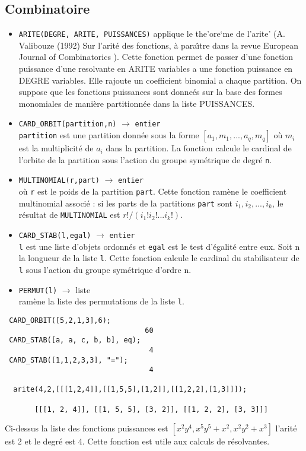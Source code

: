 \subsection{Combinatoire}
  \begin{itemize}
    \item {\tt ARITE(DEGRE, ARITE, PUISSANCES)}
applique le the'ore`me de l'arite'
(A. Valibouze (1992) Sur l'arit\'e des fonctions, \`a para{\^ \i}tre dans 
la revue European Journal of Combinatorics ). Cette fonction permet de
passer d'une fonction puissance d'une  resolvante en ARITE variables 
a une fonction puissance en DEGRE variables. Elle rajoute un
coefficient binomial a chaque partition. On suppose que les fonctions
puissances sont donne\'es sur la base des formes monomiales de mani\`ere
partitionn\'ee dans la liste PUISSANCES.

    \item {\tt CARD\_ORBIT(partition,n)}
 $\longrightarrow$ {\tt entier}\\
 {\tt partition} est une partition donn\'ee sous la forme 
$[a_1,m_1,...,a_q,m_q]$ o\`u $m_i$ est la multiplicit\'e de $a_i$
dans la partition.
La fonction calcule le cardinal de l'orbite de la partition sous
l'action du groupe sym\'etrique de degr\'e {\tt n}. 

    \item {\tt MULTINOMIAL(r,part)} 
 $\longrightarrow$ {\tt entier}\\
 o\`u {\tt r} est le poids de la partition {\tt part}. Cette
fonction ram\`ene le coefficient multinomial associ\'e : si les
parts de la partitions {\tt part} sont $i_1, i_2, ..., i_k$, le r\'esultat de
{\tt MULTINOMIAL} est $r!/(i_1!i_2!...i_k!)$.

    \item {\tt CARD\_STAB(l,egal)}
  $\longrightarrow$ {\tt entier}\\
{\tt l} est une liste d'objets ordonn\'es et {\tt egal} est le
test d'\'egalit\'e entre eux. Soit n la longueur de la liste {\tt l}.
Cette  fonction calcule le cardinal du stabilisateur de {\tt l} sous
l'action  du groupe sym\'etrique d'ordre n.

 \item {\tt PERMUT(l)} 
 $\longrightarrow$ liste\\
 ram\`ene la liste des permutations de la liste {\tt l}.

\end{itemize}
\small
\begin{verbatim}
 CARD_ORBIT([5,2,1,3],6);
                                 60
 CARD_STAB([a, a, c, b, b], eq);
                                  4
 CARD_STAB([1,1,2,3,3], "=");
                                  4

  arite(4,2,[[[1,2,4]],[[1,5,5],[1,2]],[[1,2,2],[1,3]]]);

       [[[1, 2, 4]], [[1, 5, 5], [3, 2]], [[1, 2, 2], [3, 3]]]
\end{verbatim}
Ci-dessus la liste des
fonctions puissances est $[x^2y^4,x^5y^5 + x^2,x^2y^2+x^3]$ l'arit\'e 
est 2 et le degr\'e est 4. Cette fonction est utile aux calculs de 
r\'esolvantes.
\normalsize
